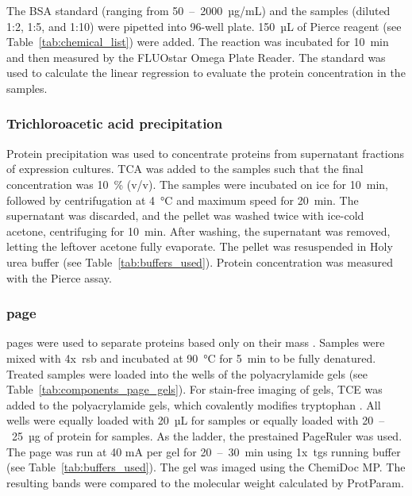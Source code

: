 \par The BSA standard (ranging from 50~--~2000~µg/mL) and the samples (diluted 1:2, 1:5, and 1:10) were pipetted into 96-well plate. 150~µL of Pierce reagent (see Table~\ref{tab:chemical_list}) were added. The reaction was incubated for 10~min and then measured by the FLUOstar Omega Plate Reader. The standard was used to calculate the linear regression to evaluate the protein concentration in the samples.
\subsubsection{Trichloroacetic acid precipitation}
Protein precipitation was used to concentrate proteins from supernatant fractions of  expression cultures. \Gls{TCA} was added to the samples such that the final concentration was 10~\% (v/v). The samples were incubated on ice for 10~min, followed by centrifugation at 4~°C and maximum speed for 20~min. The supernatant was discarded, and the pellet was washed twice with ice-cold acetone, centrifuging for 10~min. After washing, the supernatant was removed, letting the leftover acetone fully evaporate. The pellet was resuspended in Holy urea buffer (see Table~\ref{tab:buffers_used}). Protein concentration was measured with the Pierce assay. 
\subsubsection{\Gls{page}} \label{txt:SDSPAGE}
\Gls{page}s were used to separate proteins based only on their mass \parencite{smith_sds_1984, laemmli_cleavage_1970}. Samples were mixed with 4x~\gls{rsb} and incubated at 90~°C for 5~min to be fully denatured.  Treated samples were loaded into the wells of the polyacrylamide gels (see Table~\ref{tab:components_page_gels}). For stain-free imaging of gels, \gls{TCE} was added to the polyacrylamide gels, which covalently modifies tryptophan \parencite{ladner_visible_2004}. All wells were equally loaded with 20~µL for  samples or equally loaded with 20~--~25~µg of protein for  samples. As the ladder, the prestained PageRuler was used. The \gls{page} was run at 40 mA per gel for 20~--~30~min using 1x~\gls{tgs} running buffer (see Table~\ref{tab:buffers_used}). The gel was imaged using the ChemiDoc MP. The resulting bands were compared to the molecular weight calculated by ProtParam.

